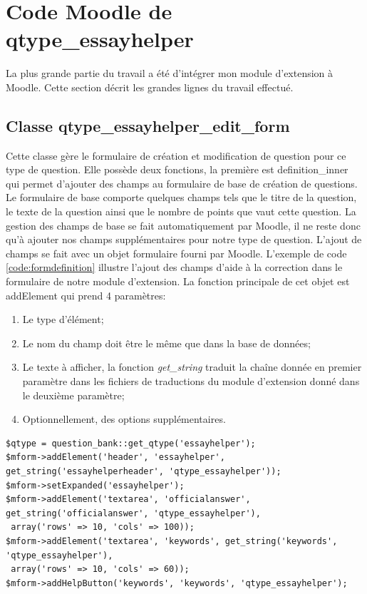 \section{Code Moodle de qtype\_essayhelper}
La plus grande partie du travail a \'et\'e d'int\'egrer mon module d'extension \`a Moodle.
Cette section d\'ecrit les grandes lignes du travail effectu\'e.
\subsection*{Classe qtype\_essayhelper\_edit\_form}
Cette classe g\`ere le formulaire de cr\'eation et modification de question pour ce type de question.
Elle poss\`ede deux fonctions, la premi\`ere est \og definition\_inner \fg{} qui permet d'ajouter des champs au formulaire de base de cr\'eation de questions.
Le formulaire de base comporte quelques champs tels que le titre de la question, le texte de la question ainsi que le nombre de points que vaut cette question.
La gestion des champs de base se fait automatiquement par Moodle, il ne reste donc qu'\`a ajouter nos champs suppl\'ementaires pour notre type de question.
L'ajout de champs se fait avec un objet formulaire fourni par Moodle.
L'exemple de code \ref{code:formdefinition} illustre l'ajout des champs d'aide \`a la correction dans le formulaire de notre module d'extension.
La fonction principale de cet objet est addElement qui prend 4 param\`etres:
\begin{enumerate}
  \item Le type d'\'el\'ement;
  \item Le nom du champ doit \^etre le m\^eme que dans la base de donn\'ees;
  \item Le texte \`a afficher, la fonction \textit{get\_string} traduit la cha\^ine donn\'ee en premier param\`etre dans les fichiers de traductions du module d'extension donn\'e dans le deuxi\`eme param\`etre;
  \item Optionnellement, des options suppl\'ementaires.
\end{enumerate}
\begin{lstfloat}
\begin{lstlisting}[frame=l]
$qtype = question_bank::get_qtype('essayhelper');
$mform->addElement('header', 'essayhelper', get_string('essayhelperheader', 'qtype_essayhelper'));
$mform->setExpanded('essayhelper');
$mform->addElement('textarea', 'officialanswer', get_string('officialanswer', 'qtype_essayhelper'),
 array('rows' => 10, 'cols' => 100));
$mform->addElement('textarea', 'keywords', get_string('keywords', 'qtype_essayhelper'),
 array('rows' => 10, 'cols' => 60));
$mform->addHelpButton('keywords', 'keywords', 'qtype_essayhelper');
\end{lstlisting}
\caption{Extrait du code de la fonction definition\_inner de la classe qtype\_essayhelper\_edit\_form.}
\label{code:formdefinition}
\end{lstfloat}
